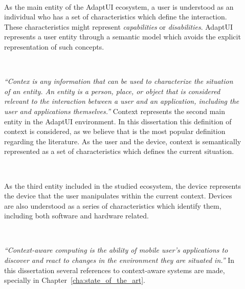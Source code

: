\begin{description}
  \item[] \hfill \\
  \begin{mdframed}[hidealllines=true,backgroundcolor=gray!20]
  As the main entity of the AdaptUI ecosystem, a user is understood as an individual
  who has a set of characteristics which define the interaction. These characteristics 
  might represent \textit{capabilities} or \textit{disabilities}. AdaptUI represents 
  a user entity through a semantic model which avoids the explicit representation 
  of such concepts. 
  \end{mdframed}

  \item[] \hfill \\
  \begin{mdframed}[hidealllines=true,backgroundcolor=gray!20]
  \textit{``Contex is any information that can be used to characterize the 
  situation of an entity. An entity is a person, place, or object that is 
  considered relevant to the interaction between a user and an application, 
  including the user and applications themselves.''} Context represents the 
  second main entity in the AdaptUI environment. In this dissertation this 
  definition of context is considered, as we believe that is the most popular 
  definition regarding the literature. As the user and the device, context is 
  semantically represented as a set of characteristics which defines the current 
  situation.
  \end{mdframed}
  
  \item[] \hfill \\
  \begin{mdframed}[hidealllines=true,backgroundcolor=gray!20]
  As the third entity included in the studied ecosystem, the device represents 
  the device that the user manipulates within the current context. Devices are
  also understood as a series of characteristics which identify them, including
  both software and hardware related.
  \end{mdframed}
  
  \item[] \hfill \\
  \begin{mdframed}[hidealllines=true,backgroundcolor=gray!20]
  \textit{``Context-aware computing is the ability of mobile user's applications 
  to discover and react to changes in the environment they are situated in.''} 
  In this dissertation several references to context-aware systems are made, 
  specially in Chapter~\ref{cha:state_of_the_art}.
  \end{mdframed}
  

\end{description}
